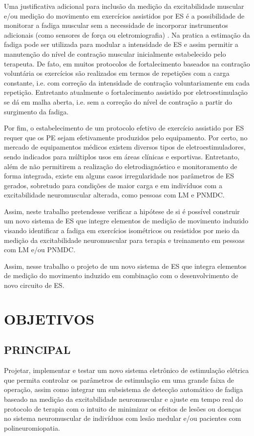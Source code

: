 Uma justificativa adicional para inclusão da medição da excitabilidade muscular e/ou medição do movimento em exercícios assistidos por \acrshort{ES} é a possibilidade de monitorar a fadiga muscular sem a necessidade de incorporar instrumentos adicionais (como sensores de força ou eletromiografia) \cite{Vollestad1997}. Na pratica a estimação da fadiga pode ser utilizada para modular a intensidade de ES e assim permitir a manutenção do nível de contração muscular inicialmente estabelecido pelo terapeuta. De fato, em muitos protocolos de fortalecimento baseados na contração voluntária os exercícios são realizados em termos de repetições com a carga constante, i.e. com correção da intensidade de contração voluntariamente em cada repetição. Entretanto atualmente o fortalecimento assistido por eletroestimulação se dá em malha aberta, i.e. sem a correção do nível de contração a partir do surgimento da fadiga.

Por fim, o estabelecimento de um protocolo efetivo de exercício assistido por \acrshort{ES} requer que os \acrshort{PE} sejam efetivamente produzidos pelo equipamento. Por certo, no mercado de equipamentos médicos existem diversos tipos de eletroestimuladores, sendo indicados para múltiplos usos em áreas clínicas e esportivas. Entretanto, além de não permitirem a realização do eletrodiagnóstico e monitoramento de forma integrada, existe em alguns casos irregularidade nos parâmetros de ES gerados, sobretudo para condições de maior carga e em indivíduos com a excitabilidade neuromuscular alterada, como pessoas com \acrshort{LM} e \acrshort{PNMDC}. 

Assim, neste trabalho pretendesse verificar a hipótese de si é possível construir um novo sistema de \acrshort{ES} que integre elementos de medição de movimento induzido visando identificar a fadiga em exercícios isométricos ou resistidos por meio da medição da excitabilidade neuromuscular para terapia e treinamento em pessoas com \acrshort{LM} e/ou \acrshort{PNMDC}.

Assim, nesse trabalho o projeto de um novo sistema de \acrshort{ES} que integra elementos de medição do movimento induzido em combinação com o desenvolvimento de novo circuito de \acrshort{ES}. 

\section{OBJETIVOS}

\subsection{PRINCIPAL}
Projetar, implementar e testar um novo sistema eletrônico de estimulação elétrica que permita controlar os parâmetros de estimulação em uma grande faixa de operação, assim como integrar um subsistema de detecção automático de fadiga baseado na medição da excitabilidade neuromuscular e ajuste em tempo real do protocolo de terapia com o intuito de minimizar os efeitos de lesões ou doenças no sistema neuromuscular de indivíduos com lesão medular e/ou pacientes com polineuromiopatia.  

